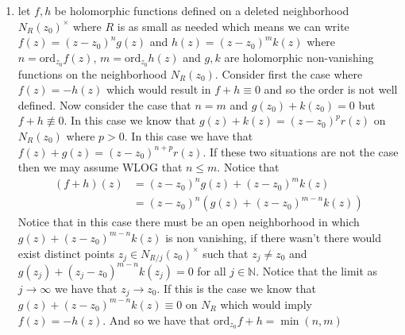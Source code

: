\documentclass[12pt]{amsart}
\theoremstyle{definition}
\newcommand{\N}{\mathbb{N}}
\newcommand{\ra}{\rightarrow}
\begin{document}
\begin{enumerate}
\begin{enumerate}
        \item let $f,h$ be holomorphic functions defined on a deleted neighborhood $N_R(z_0)^\times$ where $R$ is as small as needed which means we can write $f(z)=(z-z_0)^n g(z)$ and $h(z)=(z-z_0)^mk(z)$ where $n=\text{ord}_{z_0}f(z)$, $m=\text{ord}_{z_0}h(z)$ and $g,k$ are holomorphic non-vanishing functions on the neighborhood $N_R(z_0)$. Consider first the case where $f(z)=-h(z)$ which would result in $f+h\equiv 0$ and so the order is not well defined. Now consider the case that $n=m$ and $g(z_0)+k(z_0)=0$ but $f+h\not\equiv 0$. In this case we know that $g(z)+k(z)=(z-z_0)^pr(z)$ on $N_R(z_0)$ where $p>0$. In this case we have that $f(z)+g(z)=(z-z_0)^{n+p}r(z)$. If these two situations are not the case then we may assume WLOG that $n\leq m$. Notice that
        \begin{align*}
            (f+h)(z)&=(z-z_0)^n g(z)+(z-z_0)^m k(z)\\
            &=(z-z_0)^n( g(z)+(z-z_0)^{m-n} k(z))
        \end{align*}
        Notice that in this case there must be an open neighborhood in which $g(z)+(z-z_0)^{m-n} k(z)$ is non vanishing, if there wasn't there would exist distinct points $z_j\in N_{R/j}(z_0)^\times$ such that $z_j\neq z_0$ and $g(z_j)+(z_j-z_0)^{m-n} k(z_j)=0$ for all $j\in \N$. Notice that the limit as $j\ra \infty$ we have that $z_j\ra z_0$. If this is the case we know that $g(z)+(z-z_0)^{m-n} k(z)\equiv 0$ on $N_R$ which would imply $f(z)=-h(z)$. And so we have that $\text{ord}_{z_0}f+h=\min(n,m)$
    \end{enumerate}

\end{enumerate}
\end{document}
